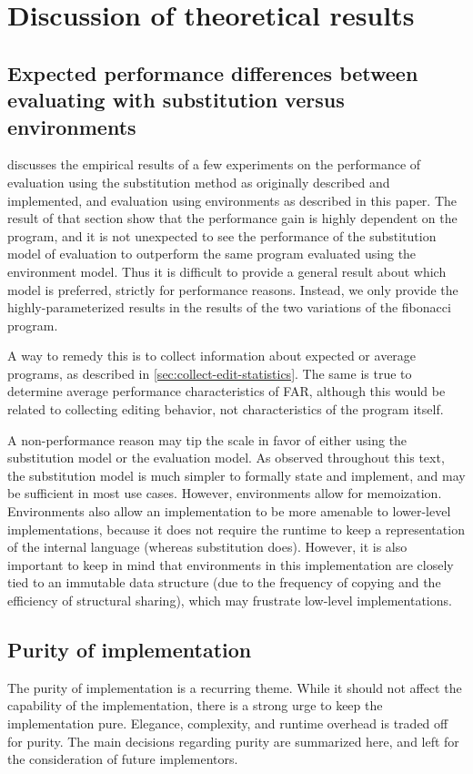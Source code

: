 \chapter{Discussion of theoretical results}
\label{sec:discussion}

\section{Expected performance differences between evaluating with substitution versus environments}
\label{sec:expected-perf-diff}

 discusses the empirical results of a few experiments on the performance of evaluation using the substitution method as originally described and implemented, and evaluation using environments as described in this paper. The result of that section show that the performance gain is highly dependent on the program, and it is not unexpected to see the performance of the substitution model of evaluation to outperform the same program evaluated using the environment model. Thus it is difficult to provide a general result about which model is preferred, strictly for performance reasons. Instead, we only provide the highly-parameterized results in the results of the two variations of the fibonacci program.

A way to remedy this is to collect information about expected or average programs, as described in \cref{sec:collect-edit-statistics}. The same is true to determine average performance characteristics of FAR, although this would be related to collecting editing behavior, not characteristics of the program itself.

A non-performance reason may tip the scale in favor of either using the substitution model or the evaluation model. As observed throughout this text, the substitution model is much simpler to formally state and implement, and may be sufficient in most use cases. However, environments allow for memoization. Environments also allow an implementation to be more amenable to lower-level implementations, because it does not require the runtime to keep a representation of the internal language (whereas substitution does). However, it is also important to keep in mind that environments in this implementation are closely tied to an immutable data structure (due to the frequency of copying and the efficiency of structural sharing), which may frustrate low-level implementations.

\section{Purity of implementation}
\label{sec:env-purity}
The purity of implementation is a recurring theme. While it should not affect the capability of the implementation, there is a strong urge to keep the implementation pure. Elegance, complexity, and runtime overhead is traded off for purity. The main decisions regarding purity are summarized here, and left for the consideration of future implementors.

